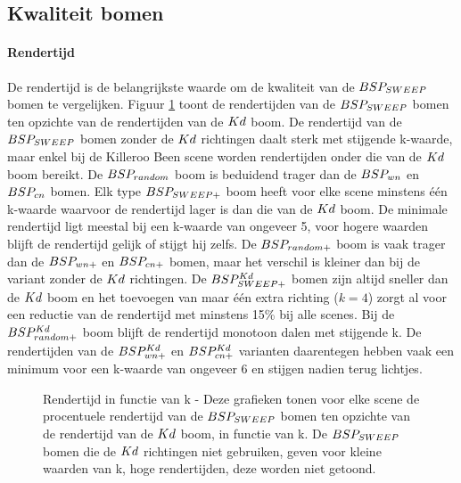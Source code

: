 \subsection{Kwaliteit bomen}
\label{h5-richtingen-kwaliteit}
\paragraph{Rendertijd}
De rendertijd is de belangrijkste waarde om de kwaliteit van de $BSP_{SWEEP}$ bomen te vergelijken. Figuur \ref{fig:k-rendertijd} toont de rendertijden van de $BSP_{SWEEP}$ bomen ten opzichte van de rendertijden van de $Kd$ boom.
De rendertijd van de $BSP_{SWEEP}$ bomen zonder de $Kd$ richtingen daalt sterk met stijgende k-waarde, maar enkel bij de Killeroo Been scene worden rendertijden onder die van de $Kd$ boom bereikt.
De $BSP_{random}$ boom is beduidend trager dan de $BSP_{wn}$ en $BSP_{cn}$ bomen.
Elk type $BSP_{SWEEP+}$ boom heeft voor elke scene minstens één k-waarde waarvoor de rendertijd lager is dan die van de $Kd$ boom.
De minimale rendertijd ligt meestal bij een k-waarde van ongeveer 5, voor hogere waarden blijft de rendertijd gelijk of stijgt hij zelfs.
De $BSP_{random+}$ boom is vaak trager dan de $BSP_{wn+}$ en $BSP_{cn+}$ bomen, maar het verschil is kleiner dan bij de variant zonder de $Kd$ richtingen.
De $BSP^{Kd}_{SWEEP+}$ bomen zijn altijd sneller dan de $Kd$ boom en het toevoegen van maar één extra richting ($k = 4$) zorgt al voor een reductie van de rendertijd met minstens 15\% bij alle scenes.
Bij de $BSP^{Kd}_{random+}$ boom blijft de rendertijd monotoon dalen met stijgende k.
De rendertijden van de $BSP^{Kd}_{wn+}$ en $BSP^{Kd}_{cn+}$ varianten daarentegen hebben vaak een minimum voor een k-waarde van ongeveer 6 en stijgen nadien terug lichtjes.
\begin{figure}
  \centering
  \begin{subfigure}[t]{.32\linewidth}
    \centering
{}
  \end{subfigure}
  \begin{subfigure}[t]{.32\linewidth}
    \centering
{}
\end{subfigure}
\begin{subfigure}[t]{.32\linewidth}
  \centering
{}
\end{subfigure}
\caption[Rendertijd in functie van k]{Rendertijd in functie van k - \small Deze grafieken tonen voor elke scene de procentuele rendertijd van de $BSP_{SWEEP}$ bomen ten opzichte van de rendertijd van de $Kd$ boom, in functie van k. De $BSP_{SWEEP}$ bomen die de $Kd$ richtingen niet gebruiken, geven voor kleine waarden van k, hoge rendertijden, deze worden niet getoond.}
\label{fig:k-rendertijd}
\end{figure}


